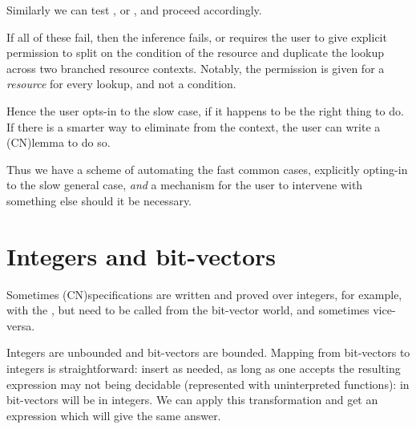 Similarly we can test ,  or , and proceed accordingly.

If all of these fail, then the inference fails, or requires the user to give
explicit permission to split on the condition of the resource and duplicate the
lookup across two branched resource contexts. Notably, the permission is given
for a \emph{resource} for every lookup, and not a condition.

%
%

Hence the user opts-in to the slow case, if it happens to be the right thing to
do. If there is a smarter way to eliminate  from the
context, the user can write a \kl(CN){lemma} to do so.

Thus we have a scheme of automating the fast common cases, explicitly opting-in
to the slow general case, \emph{and} a mechanism for the user to intervene with
something else should it be necessary.

\section{Integers and bit-vectors}\label{sec:integers-bitvectors}

Sometimes \kl(CN){specifications} are written and proved over integers, for
example, with the , but need to be called from the bit-vector
world, and sometimes vice-versa.

Integers are unbounded and bit-vectors are bounded. Mapping from bit-vectors to
integers is straightforward: insert  as needed, as long
as one accepts the resulting expression may not being decidable (represented
with uninterpreted functions):  in bit-vectors will be
 in integers. We can apply this
transformation and get an expression which will give the same answer.

